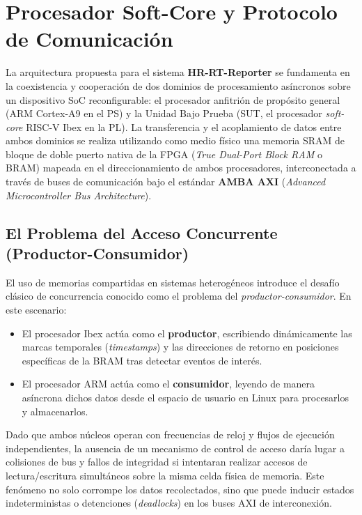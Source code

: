 \section{Procesador Soft-Core y Protocolo de Comunicación}
\label{sec:softcore_comunicacion}

La arquitectura propuesta para el sistema \textbf{HR-RT-Reporter} se fundamenta en la coexistencia y cooperación de dos dominios de procesamiento asíncronos sobre un dispositivo SoC reconfigurable: el procesador anfitrión de propósito general (ARM Cortex-A9 en el PS) y la Unidad Bajo Prueba (SUT, el procesador \textit{soft-core} RISC-V Ibex en la PL). La transferencia y el acoplamiento de datos entre ambos dominios se realiza utilizando como medio físico una memoria SRAM de bloque de doble puerto nativa de la FPGA (\textit{True Dual-Port Block RAM} o BRAM) mapeada en el direccionamiento de ambos procesadores, interconectada a través de buses de comunicación bajo el estándar \textbf{AMBA AXI} (\textit{Advanced Microcontroller Bus Architecture}).

\subsection{El Problema del Acceso Concurrente (Productor-Consumidor)}
\label{ssec:productor_consumidor}

El uso de memorias compartidas en sistemas heterogéneos introduce el desafío clásico de concurrencia conocido como el problema del \textit{productor-consumidor}. En este escenario:
\begin{itemize}
    \item El procesador Ibex actúa como el \textbf{productor}, escribiendo dinámicamente las marcas temporales (\textit{timestamps}) y las direcciones de retorno en posiciones específicas de la BRAM tras detectar eventos de interés.
    \item El procesador ARM actúa como el \textbf{consumidor}, leyendo de manera asíncrona dichos datos desde el espacio de usuario en Linux para procesarlos y almacenarlos.
\end{itemize}

Dado que ambos núcleos operan con frecuencias de reloj y flujos de ejecución independientes, la ausencia de un mecanismo de control de acceso daría lugar a colisiones de bus y fallos de integridad si intentaran realizar accesos de lectura/escritura simultáneos sobre la misma celda física de memoria. Este fenómeno no solo corrompe los datos recolectados, sino que puede inducir estados indeterministas o detenciones (\textit{deadlocks}) en los buses AXI de interconexión.


